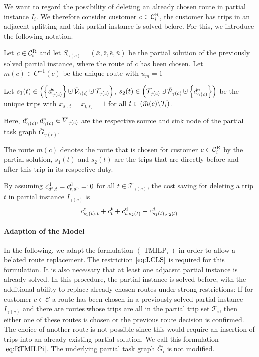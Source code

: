 We want to regard the possibility of deleting an already chosen route in partial instance $I_i$. We therefore consider customer $c\in\mathcal{C}^{\operatorname{R}}_i$, \ie the customer has trips in an adjacent splitting and this partial instance is solved before. For this, we introduce the following notation.

\begin{definition}

Let $c\in\mathcal{C}^{\operatorname{R}}_i$ and let ${S_{\gamma(c)}=\left(\bar{x},\bar{z},\bar{e},\bar{u}\right)}$ be the partial solution of the previously solved partial instance, where the route of $c$ has been chosen. Let $\bar{m}(c)\in C^{-1}(c)$ be the unique route with $\bar{u}_m = 1$

Let ${s_1(t)\in\left(\left\{\ds_{\gamma(c)}\right\}\cupdot\hat{\mathcal{V}}_{\gamma(c)}\cupdot\mathcal{T}_{\gamma(c)}\right)}$, ${s_2(t)\in\left(\mathcal{T}_{\gamma(c)}\cupdot\hat{\mathcal{P}}_{\gamma(c)}\cupdot\left\{\de_{\gamma(c)}\right\}\right)}$ be the unique trips with $\bar{x}_{s_1,t}=\bar{x}_{t,s_2}=1$ for all $t\in\left(\bar{m}(c)\backslash\mathcal{T}_i\right)$.

Here, ${d^{\operatorname{s}}_{\gamma(c)},d^{\operatorname{e}}_{\gamma(c)}\in\overline{V}_{\gamma(c)}}$ are the respective source and sink node of the partial task graph $\overline{G}_{\gamma(c)}$.

\end{definition}

The route $\bar{m}(c)$ denotes the route that is chosen for customer $c\in\mathcal{C}^{\operatorname{R}}_i$ by the partial solution, $s_1(t)$ and $s_2(t)$ are the trips that are directly before and after this trip in its respective duty. 

By assuming ${c^{\operatorname{d}}_{d^{\operatorname{s}},t}=c^{\operatorname{d}}_{t,d^{\operatorname{e}}}=:0}$ for all ${t\in\mathcal{T}_{\gamma(c)}}$, the cost saving for deleting a trip $t$ in partial instance $I_{\gamma(c)}$ is
\begin{align*}
	c^{\operatorname{d}}_{s_1(t),t}+c^{\operatorname{t}}_t+c^{\operatorname{d}}_{t,s_2(t)}-c^{\operatorname{d}}_{s_1(t),s_2(t)}
\end{align*}

\paragraph{Adaption of the Model} \parfill

In the following, we adapt the formulation $(\operatorname{TMILP}_i)$ in order to allow a belated route replacement. The restriction $\eqref{eq:LCLS}$ is required for this formulation. It is also necessary that at least one adjacent partial instance is already solved. In this procedure, the partial instance is solved before, with the additional ability to replace already chosen routes under strong restrictions: If for customer $c\in\mathcal{C}$ a route has been chosen in a previously solved partial instance $I_{\gamma(c)}$ and there are routes whose trips are all in the partial trip set $\mathcal{T}_i$, then either one of these routes is chosen or the previous route decision is confirmed. The choice of another route is not possible since this would require an insertion of trips into an already existing partial solution. We call this formulation $\eqref{eq:RTMILPi}$. The underlying partial task graph $\overline{G}_i$ is not modified.

